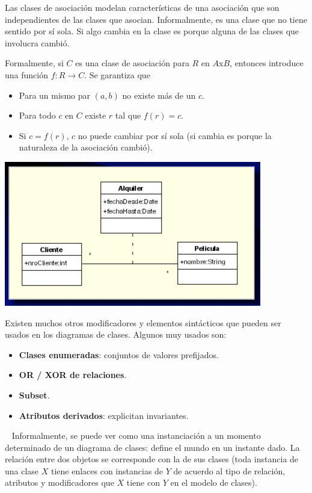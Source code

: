 \documentclass[]{article}
\begin{document}
Las clases de asociación modelan características de una asociación que son independientes de las clases que asocian. Informalmente, es una clase que no tiene sentido por sí sola. Si algo cambia en la clase es porque alguna de las clases que involucra cambió.

Formalmente, si $C$ es una clase de asociación para $R$ en $A$x$B$, entonces introduce una función $f:R\rightarrow C$. Se garantiza que
\begin{itemize}
	\item Para un mismo par $(a,b)$ no existe más de un $c$.
	\item Para todo $c$ en $C$ existe $r$ tal que $f(r)=c$.
	\item Si $c=f(r)$, $c$ no puede cambiar por sí sola (si cambia es porque la naturaleza de la asociación cambió).
\end{itemize}

\begin{center}
	\includegraphics[scale=0.6]{ClaseAsociacion.png}
\end{center}

Existen muchos otros modificadores y elementos sintácticos que pueden ser usados en los diagramas de clases. Algunos muy usados son:
\begin{itemize}
	\item \textbf{Clases enumeradas}: conjuntos de valores prefijados.
	\item \textbf{OR / XOR de relaciones}.
	\item \textbf{Subset}.
	\item \textbf{Atributos derivados}: explicitan invariantes.
\end{itemize}

~\newline
 \indent Informalmente, se puede ver como una instanciación a un momento determinado de un diagrama de clases: define el mundo en un instante dado. La relación entre dos objetos se corresponde con la de sus clases (toda instancia de una clase $X$ tiene enlaces con instancias de $Y$ de acuerdo al tipo de relación, atributos y modificadores que $X$ tiene con $Y$ en el modelo de clases).
\end{document}

